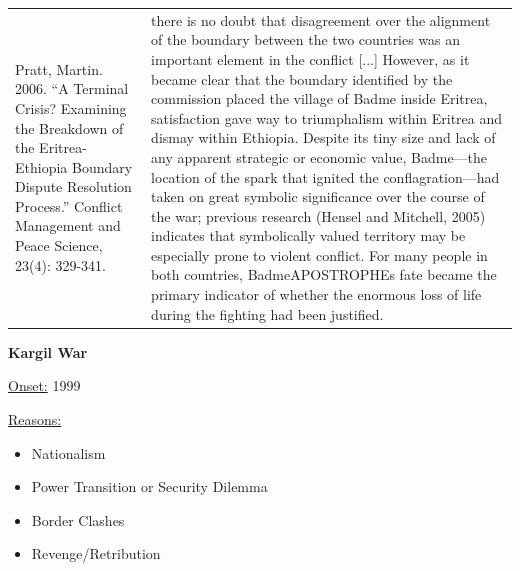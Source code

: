 {\begin{longtable}{p{}p{}}
Pratt, Martin. 2006. “A Terminal Crisis? Examining the Breakdown of the Eritrea-Ethiopia Boundary Dispute Resolution Process.” Conflict Management and Peace Science, 23(4): 329-341. & there is no doubt that disagreement over the alignment of the boundary between the two countries was an important element in the conflict [...] However, as it became clear that the boundary identified by the commission placed the village of Badme inside Eritrea, satisfaction gave way to triumphalism within Eritrea and dismay within Ethiopia. Despite its tiny size and lack of any apparent strategic or economic value, Badme—the location of the spark that ignited the conflagration—had taken on great symbolic significance over the course of the war; previous research (Hensel and Mitchell, 2005) indicates that symbolically valued territory may be especially prone to violent conflict. For many people in both countries, BadmeAPOSTROPHEs fate became the primary indicator of whether the enormous loss of life during the fighting had been justified.
\\
\end{longtable}}
\clearpage
         \textbf{Kargil War} 

          \underline{Onset:} 1999         

\underline{Reasons:}
\begin{itemize}
\item Nationalism
\item Power Transition or Security Dilemma
\item Border Clashes
\item Revenge/Retribution
\end{itemize}

